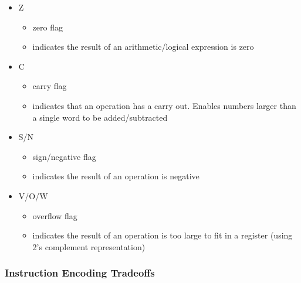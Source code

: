 \documentclass[12pt]{extarticle}
\begin{document}
	\begin{itemize}
		\item Z
		\begin{itemize}
			\item zero flag
			\item indicates the result of an arithmetic/logical expression is zero
		\end{itemize}

		\item C
		\begin{itemize}
			\item carry flag
			\item indicates that an operation has a carry out. Enables numbers larger than a single word to be added/subtracted
		\end{itemize}

		\item S/N
		\begin{itemize}
			\item sign/negative flag
			\item indicates the result of an operation is negative
		\end{itemize}

		\item V/O/W
		\begin{itemize}
			\item overflow flag
			\item indicates the result of an operation is too large to fit in a register (using 2's complement representation)
		\end{itemize}
	\end{itemize}

	\subsubsection{Instruction Encoding Tradeoffs}
\end{document}
